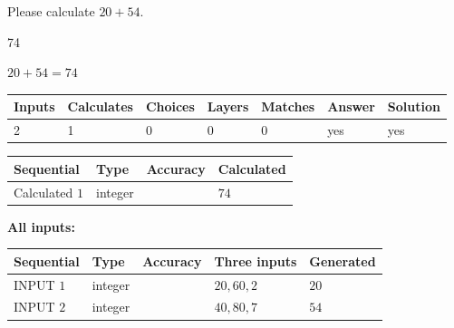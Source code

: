 \documentclass[12pt]{article}
\begin{document}
  
 
Please calculate $ %
20 +  %
54 $.
 
 
 
\noindent{}
 
 

74
 
 
\noindent{}
 
 

 
 
 
\noindent{}
 
 

$ %
20 +  %
54=   %
74$
 
 
\noindent{}
 
 

 
   
   
   
   
\noindent\begin{tabular}{|l|l|l|l|l|l|l|}
 \hline
Inputs & Calculates & Choices & Layers & Matches & Answer & Solution \\ \hline
 2  & 
 1  & 
 0
  & 
 0  & 
 0  & 
  yes & 
  yes 
  \\ \hline
 \end{tabular}
   
   
   
   
\noindent{}
   
   
  
  
\noindent\begin{tabular}{|l|l|l|l|}
\hline
 Sequential & Type & Accuracy & Calculated \\ 
\hline
 
 
  Calculated $  1 $ & integer &  & 
  $ 74 $ 
 \\  \hline  
 \end{tabular}
   
   
   
   
\noindent\vspace{0.1in}\hspace{-0.08in} {\textbf{\Large{All inputs: }}}
   
   
  
  
\noindent\begin{tabular}{|l|l|l|l|l|}
\hline
 Sequential & Type & Accuracy & Three inputs & Generated \\ 
\hline
 
 
  INPUT $  1 $ & integer &  & $
 20
 , 
 60
 , 
 2
 $ & $ 20 $ 
 \\  \hline  
 
 
  INPUT $  2 $ & integer &  & $
 40
 , 
 80
 , 
 7
 $ & $ 54 $ 
 \\  \hline  
 \end{tabular}
   
\end{document}
